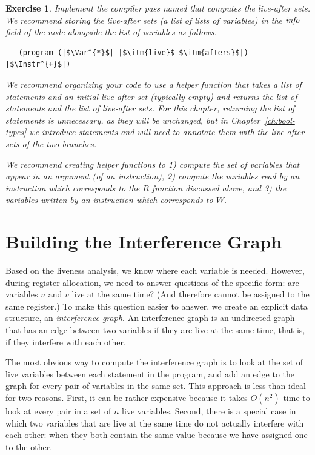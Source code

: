 \documentclass[11pt]{book}
\newtheorem{exercise}[theorem]{Exercise}
\begin{document}
\begin{exercise}\normalfont
Implement the compiler pass named  that computes
the live-after sets. We recommend storing the live-after sets (a list
of lists of variables) in the $\mathit{info}$ field of the 
node alongside the list of variables as follows.
\begin{lstlisting}
   (program (|$\Var^{*}$| |$\itm{live}$-$\itm{afters}$|) |$\Instr^{+}$|)
\end{lstlisting}
We recommend organizing your code to use a helper function that takes a
list of statements and an initial live-after set (typically empty) and
returns the list of statements and the list of live-after sets.  For
this chapter, returning the list of statements is unnecessary, as they
will be unchanged, but in Chapter~\ref{ch:bool-types} we introduce
 statements and will need to annotate them with the live-after
sets of the two branches.

We recommend creating helper functions to 1) compute the set of
variables that appear in an argument (of an instruction), 2) compute
the variables read by an instruction which corresponds to the $R$
function discussed above, and 3) the variables written by an
instruction which corresponds to $W$.
\end{exercise}

\section{Building the Interference Graph}
\label{sec:build-interference}

Based on the liveness analysis, we know where each variable is needed.
However, during register allocation, we need to answer questions of
the specific form: are variables $u$ and $v$ live at the same time?
(And therefore cannot be assigned to the same register.)  To make this
question easier to answer, we create an explicit data structure, an
\emph{interference graph}.  An interference graph is an undirected
graph that has an edge between two variables if they are live at the
same time, that is, if they interfere with each other.

The most obvious way to compute the interference graph is to look at
the set of live variables between each statement in the program, and
add an edge to the graph for every pair of variables in the same set.
This approach is less than ideal for two reasons. First, it can be
rather expensive because it takes $O(n^2)$ time to look at every pair
in a set of $n$ live variables. Second, there is a special case in
which two variables that are live at the same time do not actually
interfere with each other: when they both contain the same value
because we have assigned one to the other.
\end{document}
